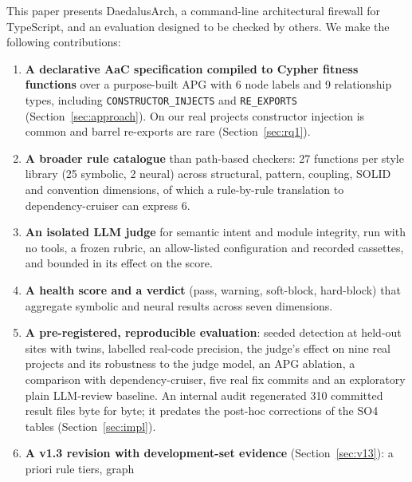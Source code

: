 \documentclass[10pt,a4paper]{article}
\newcommand{\tool}{DaedalusArch}
\newcommand{\dc}{dependency-cruiser}
\newcommand{\edge}[1]{\texttt{\small #1}}
\begin{document}
This paper presents \tool{}, a command-line architectural firewall for TypeScript, and an evaluation designed to be
checked by others. We make the following contributions:
\begin{enumerate}
  \item \textbf{A declarative AaC specification compiled to Cypher fitness functions} over a purpose-built APG with
        6 node labels and 9 relationship types, including \edge{CONSTRUCTOR\_INJECTS} and \edge{RE\_EXPORTS}
        (Section~\ref{sec:approach}). On our real projects constructor injection is common and barrel re-exports
        are rare (Section~\ref{sec:rq1}). %
  \item \textbf{A broader rule catalogue} than path-based checkers: 27 functions per style library (25 symbolic, 2
        neural) across structural, pattern, coupling, SOLID and convention dimensions, of which a rule-by-rule
        translation to \dc{} can express 6. %
  \item \textbf{An isolated LLM judge} for semantic intent and module integrity, run with no tools, a frozen rubric,
        an allow-listed configuration and recorded cassettes, and bounded in its effect on the score.
  \item \textbf{A health score and a verdict} (pass, warning, soft-block, hard-block) that aggregate symbolic and
        neural results across seven dimensions.
  \item \textbf{A pre-registered, reproducible evaluation}: seeded detection at held-out sites with twins, labelled
        real-code precision, the judge's effect on nine real projects and its robustness to the judge model, an APG
        ablation, a comparison with \dc{}, five real fix commits and an exploratory plain LLM-review baseline. An
        internal audit regenerated 310 committed result files byte for byte; it predates the post-hoc corrections
        of the SO4 tables (Section~\ref{sec:impl}).
  \item \textbf{A v1.3 revision with development-set evidence} (Section~\ref{sec:v13}): a priori rule tiers, graph

\end{enumerate}
\end{document}

